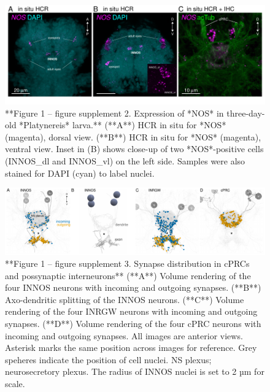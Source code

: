 \documentclass[
  10pt,
  onecolumn]{article}
\begin{document}
\begin{figure}
\includegraphics[width=16.67in]{figures/Fig1_sup2} \caption{**Figure 1 -- figure supplement 2. Expression of *NOS* in three-day-old *Platynereis* larva.** (**A**) HCR in situ for *NOS* (magenta), dorsal view. (**B**) HCR in situ for *NOS* (magenta), ventral view. Inset in (B) shows close-up of two *NOS*-positive cells (INNOS_dl and INNOS_vl) on the left side. Samples were also stained for DAPI (cyan) to label nuclei.}\label{fig:unnamed-chunk-10}
\end{figure}

\begin{figure}
\includegraphics[width=43.06in]{figures/Fig1_sup3} \caption{**Figure 1 -- figure supplement 3. Synapse distribution in cPRCs and possynaptic interneurons** (**A**) Volume rendering of the four INNOS neurons with incoming and outgoing synapses. (**B**) Axo-dendritic splitting of the INNOS neurons. (**C**) Volume rendering of the four INRGW neurons with incoming and outgoing synapses. (**D**) Volume rendering of the four cPRC neurons with incoming and outgoing synapses. All images are anterior views. Asterisk marks the same position across images for reference. Grey speheres indicate the position of cell nuclei. NS plexus; neurosecretory plexus. The radius of INNOS nuclei is set to 2 µm for scale.}\label{fig:unnamed-chunk-11}
\end{figure}
\end{document}
